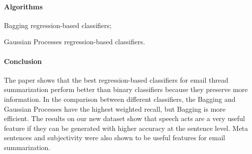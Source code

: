 \paragraph{Algorithms}
\begin{my_itemize}
  \item Bagging regression-based classifiers;
  \item Gaussian Processes regression-based classifiers.
\end{my_itemize}

\paragraph{Conclusion}
The paper shows that the best regression-based classifiers for email thread summarization perform better than binary classifiers because they preserve more information. In the comparison between different classifiers, the Bagging and Gaussian Processes have the highest weighted recall, but Bagging is more efficient. The results on our new dataset show that speech acts are a very useful feature if they can be generated with higher accuracy at the sentence level. Meta sentences and subjectivity were also shown to be useful features for email summarization.

